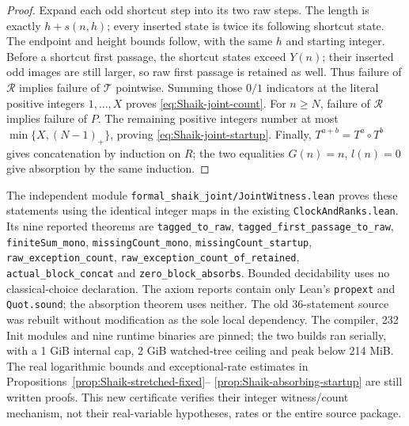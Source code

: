 \begin{proof}
Expand each odd shortcut step into its two raw steps. The length is
exactly \(h+s(n,h)\); every inserted state is twice its following
shortcut state. The endpoint and height bounds follow, with the
same \(h\) and starting integer. Before a shortcut first passage,
the shortcut states exceed \(Y(n)\); their inserted odd images are
still larger, so raw first passage is retained as well.
Thus failure of \(\mathcal R\) implies failure of \(\mathcal T\)
pointwise. Summing those \(0/1\) indicators at the literal positive
integers \(1,\ldots,X\) proves \eqref{eq:Shaik-joint-count}.
For \(n\ge N\), failure of \(\mathcal R\) implies failure of \(P\).
The remaining positive integers number at most
\(\min\{X,(N-1)_+\}\), proving \eqref{eq:Shaik-joint-startup}.
Finally, \(T^{a+b}=T^a\circ T^b\) gives concatenation by induction
on \(R\); the two equalities \(G(n)=n\), \(l(n)=0\) give absorption
by the same induction.
\end{proof}

The independent module \texttt{formal\_shaik\_joint/JointWitness.lean}
proves these statements using the identical integer maps in the
existing \texttt{ClockAndRanks.lean}. Its nine reported theorems are
\texttt{tagged\_to\_raw}, \texttt{tagged\_first\_passage\_to\_raw},
\texttt{finiteSum\_mono}, \texttt{missingCount\_mono},
\texttt{missingCount\_startup}, \texttt{raw\_exception\_count},
\texttt{raw\_exception\_count\_of\_retained},
\texttt{actual\_block\_concat} and \texttt{zero\_block\_absorbs}.
Bounded decidability uses no classical-choice declaration.
The axiom reports contain only Lean's \texttt{propext} and
\texttt{Quot.sound}; the absorption theorem uses neither.
The old 36-statement source was rebuilt without modification as the
sole local dependency. The compiler, 232 Init modules and nine runtime
binaries are pinned; the two builds ran serially, with a 1 GiB internal
cap, 2 GiB watched-tree ceiling and peak below 214 MiB.
The real logarithmic bounds and exceptional-rate estimates in
Propositions~\ref{prop:Shaik-stretched-fixed}--%
\ref{prop:Shaik-absorbing-startup} are still written proofs.
This new certificate verifies their integer witness/count mechanism,
not their real-variable hypotheses, rates or the entire source package.

